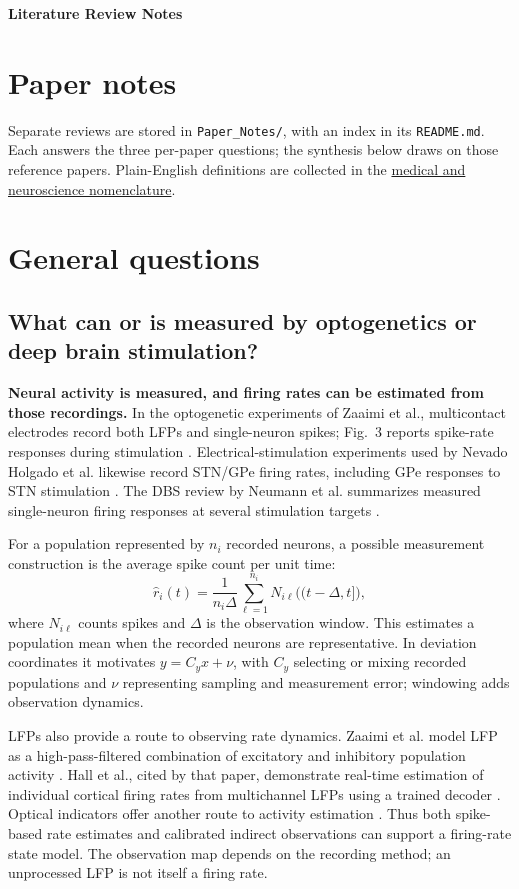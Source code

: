 ﻿\documentclass[11pt,a4paper]{article}
\begin{document}
{\LARGE\bfseries Literature Review Notes}

\section*{Paper notes}

Separate reviews are stored in \texttt{Paper\_Notes/}, with an index
in its \texttt{README.md}. Each answers the three per-paper questions;
the synthesis below draws on those reference papers.
Plain-English definitions are collected in the
\hyperref[sec:medical-nomenclature]{medical and neuroscience nomenclature}.

\section*{General questions}

\subsection*{What can or is measured by optogenetics or deep brain stimulation?}
\textbf{Neural activity is measured, and firing rates can be estimated
from those recordings.} In the optogenetic experiments of Zaaimi et al.,
multicontact electrodes record both LFPs and single-neuron spikes;
Fig.~3 reports spike-rate responses during stimulation
\cite[PDF pp.~2, 5]{zaaimi2023}. Electrical-stimulation experiments used
by Nevado Holgado et al. likewise record STN/GPe firing rates, including
GPe responses to STN stimulation \cite[PDF pp.~3--4]{nevado2010}.
The DBS review by Neumann et al. summarizes measured single-neuron
firing responses at several stimulation targets
\cite[PDF pp.~4--6]{neumann2023}.

For a population represented by $n_i$ recorded neurons, a possible
measurement construction is the average spike count per unit time:
\begin{equation*}
\widehat r_i(t)=\frac{1}{n_i\Delta}
\sum_{\ell=1}^{n_i}N_{i\ell}\bigl((t-\Delta,t]\bigr),
\end{equation*}
where $N_{i\ell}$ counts spikes and $\Delta$ is the observation window.
This estimates a population mean when the recorded neurons are
representative. In deviation coordinates it motivates
$y=C_yx+\nu$, with $C_y$ selecting or mixing recorded populations and
$\nu$ representing sampling and measurement error; windowing adds
observation dynamics.

LFPs also provide a route to observing rate dynamics. Zaaimi et al.
model LFP as a high-pass-filtered combination of excitatory and
inhibitory population activity \cite[PDF pp.~9, 15]{zaaimi2023}.
Hall et al., cited by that paper, demonstrate real-time estimation of
individual cortical firing rates from multichannel LFPs using a trained
decoder \cite{hall2014}. Optical indicators offer another route to
activity estimation \cite{grosenick2015,fenno2011}.
Thus both spike-based rate estimates and calibrated indirect
observations can support a firing-rate state model. The observation
map depends on the recording method; an unprocessed LFP is not itself
a firing rate.
\end{document}
